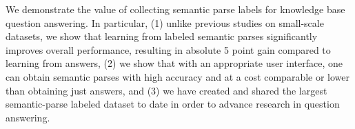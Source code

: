 We demonstrate the value of collecting semantic parse labels for knowledge base question answering. In particular, (1) unlike previous studies on small-scale datasets, we show that learning from labeled semantic parses significantly improves overall performance, resulting in absolute 5 point gain compared to learning from answers, (2) we show that with an appropriate user interface, one can obtain semantic parses with high accuracy and at a cost comparable or lower than obtaining just answers, and (3) we have created and shared the largest semantic-parse labeled dataset to date in order to advance research in question answering.
